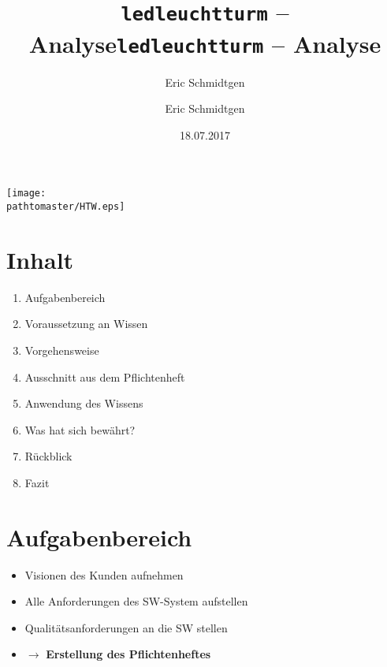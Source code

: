 \documentclass[ignorenonframetext, 11pt, table]{beamer}
\author{Eric Schmidtgen}
\title{\texttt{ledleuchtturm} -- Analyse}
\date{18.07.2017}
\gdef\pathtomaster{../_LaTeX_master}
\begin{document}
	\author{Eric Schmidtgen}
	\title{\texttt{ledleuchtturm} -- Analyse}
	
	\begin{frame}[plain]
		\begin{center}
			\texttt{[image: \\pathtomaster/HTW.eps]}
		\end{center}
		\maketitle
	\end{frame}
	
	
	\section{Inhalt}
	\begin{frame}
	\begin{enumerate}
		\item Aufgabenbereich
		\item Voraussetzung an Wissen
		\item Vorgehensweise
		\item Ausschnitt aus dem Pflichtenheft
		\item Anwendung des Wissens
		\item Was hat sich bewährt?
		\item Rückblick
		\item Fazit
	\end{enumerate}

	\end{frame}
	
	\section{Aufgabenbereich}
	\begin{frame}
		\begin{itemize}
			\setlength\itemsep{0.2em}
			\item<1-> Visionen des Kunden aufnehmen
			\item<2-> Alle Anforderungen des SW-System aufstellen
			\item<3-> Qualitätsanforderungen an die SW stellen
			\item<4->[] $\rightarrow$ \textbf{Erstellung des Pflichtenheftes}
		\end{itemize}
	\end{frame}
	
\end{document}
